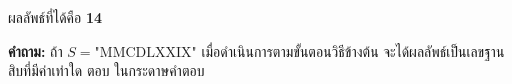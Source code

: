 ผลลัพธ์ที่ได้คือ \textbf{14}

\textbf{คำถาม:} ถ้า $S = \text{"MMCDLXXIX"}$ เมื่อดำเนินการตามขั้นตอนวิธีข้างต้น จะได้ผลลัพธ์เป็นเลขฐานสิบที่มีค่าเท่าใด
\newline\newline
ตอบ ในกระดาษคำตอบ \newline
